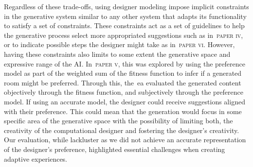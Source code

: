 
Regardless of these trade-offs, using designer modeling impose implicit constraints in the generative system similar to any other system that adapts its functionality to satisfy a set of constraints. These constraints act as a set of guidelines to help the generative process select more appropriated suggestions such as in~\textsc{paper iv}, or to indicate possible steps the designer might take as in~\textsc{paper vi}. However, having these constraints also limits to some extent the generative space and expressive range of the AI. In~\textsc{paper v}, this was explored by using the preference model as part of the weighted sum of the fitness function to infer if a generated room might be preferred. Through this, the~\acrshort{ea} evaluated the generated content objectively through the fitness function, and subjectively through the preference model. If using an accurate model, the designer could receive suggestions aligned with their preference. This could mean that the generation would focus in some specific area of the generative space with the possibility of limiting both, the creativity of the computational designer and fostering the designer's creativity. Our evaluation, while lackluster as we did not achieve an accurate representation of the designer's preference, highlighted essential challenges when creating adaptive experiences. 






